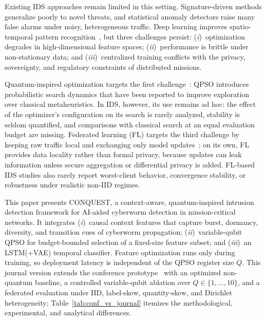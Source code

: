 \documentclass[conference]{IEEEtran}
\begin{document}
Existing IDS approaches remain limited in this setting.
Signature-driven methods generalize poorly to novel threats, and
statistical anomaly detectors raise many false alarms under noisy,
heterogeneous traffic. Deep learning improves spatio-temporal pattern
recognition~\cite{al202}, but three challenges persist:
(\textit{i})~optimization degrades in high-dimensional feature spaces;
(\textit{ii})~performance is brittle under non-stationary data; and
(\textit{iii})~centralized training conflicts with the privacy,
sovereignty, and regulatory constraints of distributed missions.

Quantum-inspired optimization targets the first
challenge~\cite{ajakwe2025eqai,vivekquantum}: QPSO introduces
probabilistic search dynamics that have been reported
to improve exploration over classical metaheuristics. In IDS,
however, its use remains ad hoc: the effect of the optimizer's
configuration on its search is rarely analyzed, stability is seldom quantified, and
comparisons with classical search at an equal
evaluation budget are missing. Federated learning (FL) targets the
third challenge by keeping raw traffic local and exchanging only
model updates~\cite{hamadsystematic}; on its
own, FL provides data locality rather than formal privacy, because
updates can leak information unless secure aggregation or
differential privacy is added. FL-based IDS studies also rarely
report worst-client behavior, convergence stability, or robustness
under realistic non-IID regimes.

This paper presents CONQUEST, a context-aware, quantum-inspired
intrusion detection framework for AI-aided cyberworm detection in
mission-critical networks. It integrates (\textit{i})~causal context
features that capture burst, dormancy, diversity, and transition cues
of cyberworm propagation; (\textit{ii})~variable-qubit QPSO for
budget-bounded selection of a fixed-size
feature subset; and (\textit{iii})~an LSTM(+VAE) temporal
classifier. Feature optimization runs only during training, so
deployment latency is independent of the
QPSO register size $Q$. This journal version extends the conference
prototype~\cite{ajakweconquest} with an optimized non-quantum
baseline, a controlled variable-qubit ablation over
$Q\in\{1,\dots,10\}$, and a federated evaluation
under IID, label-skew, quantity-skew, and Dirichlet heterogeneity;
Table~\ref{tab:conf_vs_journal} itemizes the
methodological, experimental, and analytical differences.
\end{document}
